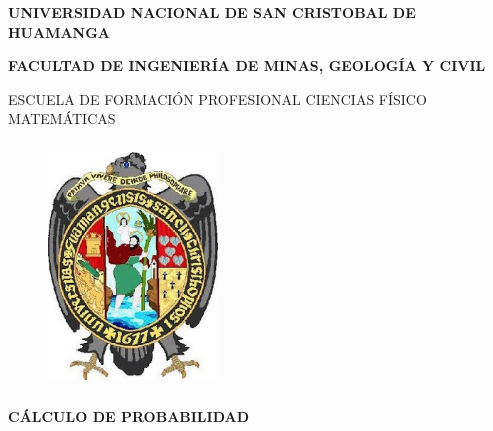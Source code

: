 \documentclass[12pt]{article}
\begin{document}
\begin{titlepage}

\begin{center}

\vspace*{-1.5in}

{\fontsize{14}{15}\bf \selectfont UNIVERSIDAD NACIONAL DE SAN CRISTOBAL DE HUAMANGA}\\

\vspace*{0.5cm}

{\fontsize{12}{15}\bf \selectfont FACULTAD DE INGENIERÍA DE MINAS, GEOLOGÍA Y CIVIL\\ }

\vspace*{0.15in} ESCUELA DE FORMACIÓN PROFESIONAL CIENCIAS FÍSICO MATEMÁTICAS \\

\vspace*{0.2in}

\begin{figure}[htb]

\begin{center}

\includegraphics[width=4.5cm,height=6.5cm]{unsch.jpg}

\end{center}

\end{figure}

\begin{Large}

\textbf{CÁLCULO DE PROBABILIDAD }\\



\end{Large}

\vspace*{0.3in}

\begin{large}


\end{large}
\end{center}
\end{titlepage}
\end{document}
